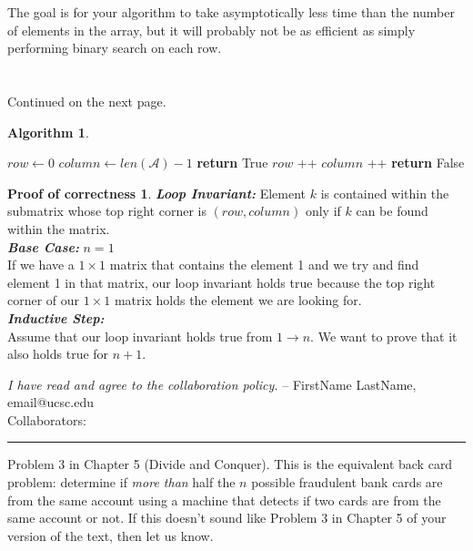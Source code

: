 \documentclass[11pt]{article}
\theoremstyle{definition}
\newtheorem*{algorithm}{Algorithm}
\newtheorem*{proofoc}{Proof of correctness}
\begin{document}
\begin{enumerate}
The goal is for your algorithm to take asymptotically less time than the number of elements 
in the array,  but it will probably not be as efficient as simply performing binary search on each row.
\\
\\
\\
Continued on the next page.
\newpage
\begin{algorithm}
    \item 
    \begin{algorithmic}[1]
         
        \State $row \gets 0$
        \State $column \gets len(\mathcal{A})-1$
                \State \textbf{return} True
                \State $row$ ++
            \Else 
                \State $column$ ++
            \EndIf
        \EndWhile
        \State \textbf{return} False
        \EndProcedure
    \end{algorithmic}
\end{algorithm}
\newpage
\begin{proofoc}
    \item 
    \textbf{\textit{Loop Invariant:} }Element $k$ is contained within the submatrix whose top right corner is $(row, column)$ only if $k$ can be found within the matrix. \\[0.7em]
    \textbf{\textit{Base Case: }}$n=1$\\
    If we have a $1\times1$ matrix that contains the element 1 and we try and find element 1 in that matrix, our loop invariant holds true because 
    the top right corner of our $1 \times 1$ matrix holds the element we are looking for. \\[0.7em]
    \textbf{\textit{Inductive Step: }} \\
    Assume that our loop invariant holds true from $1 \rightarrow n$. We want to prove that it also holds true for $n+1$. 
    

\end{proofoc}
\newpage

\emph{I have read and agree to the collaboration policy.}  -- FirstName LastName, email@ucsc.edu
\\
Collaborators: %
\\
\hrule
\item Problem 3 in Chapter 5 (Divide and Conquer).  This is the equivalent back card problem: determine if \emph{more than} half the $n$ possible fraudulent bank cards are from the same account using a machine that detects if two cards are from the same account or not.   If this doesn't sound like Problem 3 in Chapter 5 of your version of the text, then let us know.


\end{enumerate}
\end{document}
